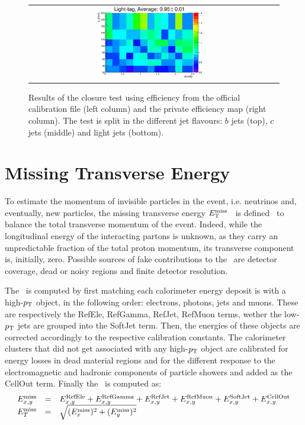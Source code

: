 \begin{figure}
\begin{center}
\begin{tabular}{c c}
    \includegraphics[width=0.45\textwidth]{objectsreconstruction/figures/TRFmethod/0myclosureRebin.eps} \\
  \end{tabular}
  \end{center}
  \caption{Results of the closure test using efficiency from the official calibration file 
  (left column) and the private efficiency map (right column). The test is split in the
 different jet flavours: $b$ jets (top), $c$ jets (middle) and light jets (bottom). }
  \label{fig:closure}
\end{figure}




\section{Missing Transverse Energy}\label{sec:met}

To estimate the momentum of invisible particles in the event, i.e. neutrinos and, eventually, new particles,
the missing transverse energy $\met$~\cite{met} is defined~\cite{topcommon2013} to balance the total transverse momentum of the event.
Indeed, while the longitudinal energy of the interacting partons is unknown, as they carry an unpredictable
fraction of the total proton momentum, its transverse component is, initially, zero.
Possible sources of fake contributions to the \met\ are detector coverage, dead or noisy regions and
finite detector resolution.

The \met\ is computed by first matching each calorimeter energy 
deposit is with a high-$\pt$ object,  in the following order: electrons, photons, jets and muons.
These are respectively the RefEle, RefGamma, RefJet, RefMuon terms, wether the low-$\pt$ jets
are grouped into the SoftJet term. Then, the energies of these objects are
corrected accordingly to the respective calibration constants. 
The calorimeter clusters
that did not get associated with any  high-$\pt$ object are calibrated for energy losses in 
dead material regions and for the different response to the electromagnetic and hadronic
components of particle showers and added as the CellOut term. 
Finally the \met\ is computed as:
\begin{equation}\label{eq:met}
\begin{array}{lcl}
E^{\rm miss}_{x,y} & = & E^{\rm RefEle}_{x,y} + E^{\rm RefGamma}_{x,y} + E^{\rm RefJet}_{x,y} + E^{\rm RefMuon}_{x,y} + E^{\rm SoftJet}_{x,y} + E^{\rm CellOut}_{x,y}\\
E^{\rm miss}_{T} & = & \sqrt{(E^{\rm miss}_{x})^2 + (E^{\rm miss}_{y})^2}\\
\end{array}	\end{equation}

